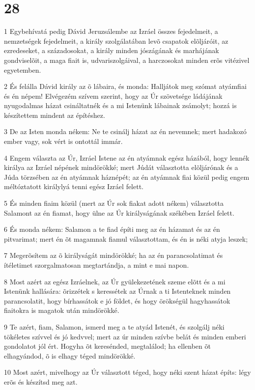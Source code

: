 \chapter{28}

\par 1 Egybehívatá pedig Dávid Jeruzsálembe az Izráel összes fejedelmeit, a nemzetségek fejedelmeit, a király szolgálatában levõ csapatok elõljáróit, az ezredeseket, a századosokat, a király minden jószágának és marhájának gondviselõit, a maga fiait is, udvariszolgáival, a harczosokat minden erõs vitézivel egyetemben.
\par 2 És felálla Dávid király az õ lábaira, és monda: Halljátok meg szómat atyámfiai és én népem! Elvégezém szívem szerint, hogy az Úr szövetsége ládájának nyugodalmas házat csináltatnék és a mi Istenünk lábainak zsámolyt; hozzá is készítettem mindent az építéshez.
\par 3 De az Isten monda nékem: Ne te csinálj házat az én nevemnek; mert hadakozó ember vagy, sok vért is ontottál immár.
\par 4 Engem választa az Úr, Izráel Istene az én atyámnak egész házából, hogy lennék királya az Izráel népének mindörökké; mert Júdát választotta elõljárónak és a Júda törzsében az én atyámnak  háznépét; az én atyámnak fiai közül pedig engem méltóztatott királylyá tenni egész Izráel felett.
\par 5 És minden fiaim közül (mert az Úr sok fiakat adott nékem) választotta Salamont az én fiamat, hogy ülne az Úr királyságának székében Izráel felett.
\par 6 És monda nékem: Salamon a te fiad építi meg az én házamat és az én pitvarimat; mert én õt magamnak fiamul választottam, és én is néki atyja leszek;
\par 7 Megerõsítem az õ királyságát mindörökké; ha az én parancsolatimat és ítéletimet szorgalmatosan megtartándja, a mint e mai napon.
\par 8 Most azért az egész Izráelnek, az Úr gyülekezetének szeme elõtt és a mi Istenünk hallására: õrizzétek s keressétek az Úrnak a ti Istenteknek minden parancsolatit, hogy bírhassátok e jó földet, és hogy örökségül hagyhassátok fiaitokra is magatok után mindörökké.
\par 9 Te azért, fiam, Salamon, ismerd meg a te atyád Istenét, és szolgálj néki tökéletes szívvel és jó kedvvel; mert az úr minden szívbe belát és minden emberi gondolatot jól ért. Hogyha õt keresénded, megtalálod; ha ellenben õt elhagyándod, õ is elhagy téged mindörökké.
\par 10 Most azért, mivelhogy az Úr választott téged, hogy néki szent házat építs: légy erõs és készítsd meg azt.
